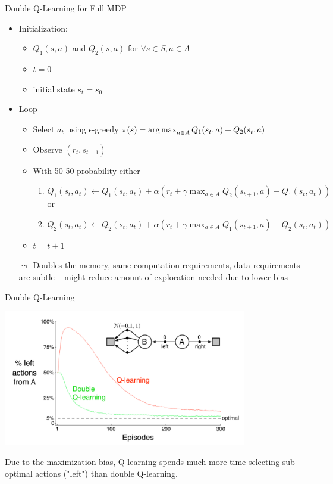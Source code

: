 \begin{frame}[c]{Double Q-Learning for Full MDP}	
	
	\begin{itemize}
		\item Initialization:
		\begin{itemize}
			\item $Q_1(s,a)$ and $Q_2(s,a)$ for $\forall s \in S, a\in A$
			\item $t= 0$
			\item initial state $s_t = s_0$
		\end{itemize}
		\item Loop
		\begin{itemize}
			\item Select $a_t$ using $\epsilon$-greedy $\pi(s) = \operatorname*{arg\,max}_{a \in A} Q_1(s_t, a) + Q_2(s_t , a)$
			\item Observe $(r_t, s_{t+1})$
			\item With 50-50 probability either
			\begin{enumerate}
				\item $Q_1(s_t, a_t) \gets Q_1(s_t, a_t) + \alpha (r_t +\gamma \max_{a\in A} Q_2(s_{t+1}, a) - Q_1(s_t, a_t))$\\
				or
				\item $Q_2(s_t, a_t) \gets Q_2(s_t, a_t) + \alpha (r_t +\gamma \max_{a\in A} Q_1(s_{t+1}, a) - Q_2(s_t, a_t))$
			\end{enumerate}
			\item $t = t + 1 $
		\end{itemize}
		\bigskip
		\pause
		\item[$\leadsto$] Doubles the memory, same computation requirements, data requirements are subtle -- might reduce amount of exploration needed due to lower bias
	\end{itemize}
	
	
\end{frame}
\begin{frame}[c]{Double Q-Learning }	
	
\begin{center}
\includegraphics[width=0.8\textwidth]{images/double_q.png}
\end{center}

Due to the maximization bias, Q-learning spends much more time
selecting sub-optimal actions ("left") than double Q-learning.
	
	
\end{frame}

